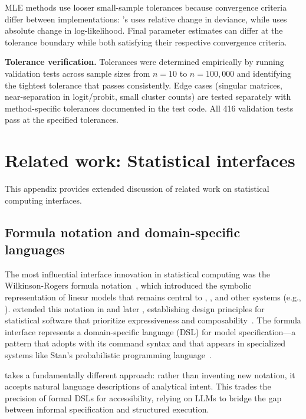 MLE methods use looser small-sample tolerances because convergence criteria
differ between implementations: 's  uses relative
change in deviance, while  uses absolute change in
log-likelihood. Final parameter estimates can differ at the tolerance boundary
while both satisfying their respective convergence criteria.

\textbf{Tolerance verification.} Tolerances were determined empirically by
running validation tests across sample sizes from $n = 10$ to $n = 100{,}000$
and identifying the tightest tolerance that passes consistently. Edge cases
(singular matrices, near-separation in logit/probit, small cluster counts)
are tested separately with method-specific tolerances documented in the
test code. All 416 validation tests pass at the specified tolerances.


\section{Related work: Statistical interfaces} \label{app:related-work}
\setcounter{table}{0}
\setcounter{figure}{0}

This appendix provides extended discussion of related work on statistical
computing interfaces.

\subsection{Formula notation and domain-specific languages}

The most influential interface innovation in statistical computing was the
Wilkinson-Rogers formula notation~\citep{Wilkinson+Rogers:1973}, which
introduced the symbolic representation of linear models that remains central
to , , and other systems (e.g., ).
\cite{Chambers+Hastie:1992} extended this notation in  and later
, establishing design principles for statistical software that
prioritize expressiveness and composability~\citep{Chambers:1998, Chambers:2008}.
The formula interface represents a domain-specific language (DSL) for model
specification---a pattern that  adopts with its command syntax
and that appears in specialized systems like Stan's probabilistic programming
language~\citep{Carpenter+etal:2017}.

 takes a fundamentally different approach: rather than
inventing new notation, it accepts natural language descriptions of analytical
intent. This trades the precision of formal DSLs for accessibility, relying
on LLMs to bridge the gap between informal specification and structured
execution.

